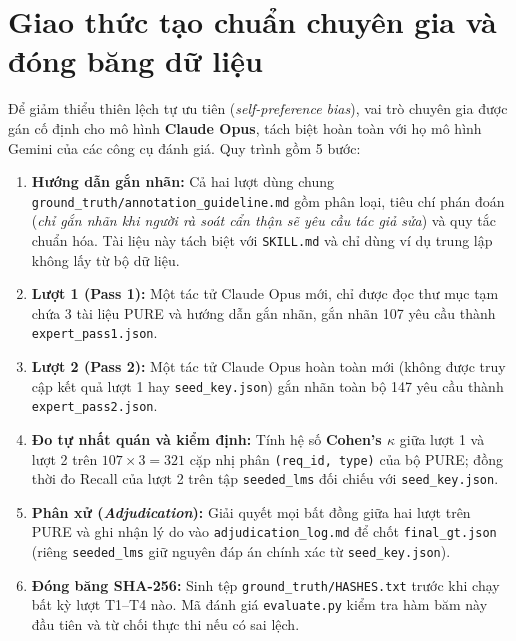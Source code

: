 \documentclass[12pt,a4paper]{report}
\begin{document}
\section{Giao thức tạo chuẩn chuyên gia và đóng băng dữ liệu}
Để giảm thiểu thiên lệch tự ưu tiên (\textit{self-preference bias}), vai trò chuyên gia được gán cố định cho mô hình \textbf{Claude Opus}, tách biệt hoàn toàn với họ mô hình Gemini của các công cụ đánh giá. Quy trình gồm 5 bước:
\begin{enumerate}
  \item \textbf{Hướng dẫn gắn nhãn:} Cả hai lượt dùng chung \texttt{ground\_truth/annotation\_guideline.md} gồm phân loại, tiêu chí phán đoán (\textit{chỉ gắn nhãn khi người rà soát cẩn thận sẽ yêu cầu tác giả sửa}) và quy tắc chuẩn hóa. Tài liệu này tách biệt với \texttt{SKILL.md} và chỉ dùng ví dụ trung lập không lấy từ bộ dữ liệu.
  \item \textbf{Lượt 1 (Pass 1):} Một tác tử Claude Opus mới, chỉ được đọc thư mục tạm chứa 3 tài liệu PURE và hướng dẫn gắn nhãn, gắn nhãn 107 yêu cầu thành \texttt{expert\_pass1.json}.
  \item \textbf{Lượt 2 (Pass 2):} Một tác tử Claude Opus hoàn toàn mới (không được truy cập kết quả lượt 1 hay \texttt{seed\_key.json}) gắn nhãn toàn bộ 147 yêu cầu thành \texttt{expert\_pass2.json}.
  \item \textbf{Đo tự nhất quán và kiểm định:} Tính hệ số \textbf{Cohen's $\kappa$} giữa lượt 1 và lượt 2 trên $107 \times 3 = 321$ cặp nhị phân \texttt{(req\_id, type)} của bộ PURE; đồng thời đo Recall của lượt 2 trên tập \texttt{seeded\_lms} đối chiếu với \texttt{seed\_key.json}.
  \item \textbf{Phân xử (\textit{Adjudication}):} Giải quyết mọi bất đồng giữa hai lượt trên PURE và ghi nhận lý do vào \texttt{adjudication\_log.md} để chốt \texttt{final\_gt.json} (riêng \texttt{seeded\_lms} giữ nguyên đáp án chính xác từ \texttt{seed\_key.json}).
  \item \textbf{Đóng băng SHA-256:} Sinh tệp \texttt{ground\_truth/HASHES.txt} trước khi chạy bất kỳ lượt T1--T4 nào. Mã đánh giá \texttt{evaluate.py} kiểm tra hàm băm này đầu tiên và từ chối thực thi nếu có sai lệch.
\end{enumerate}
\end{document}

